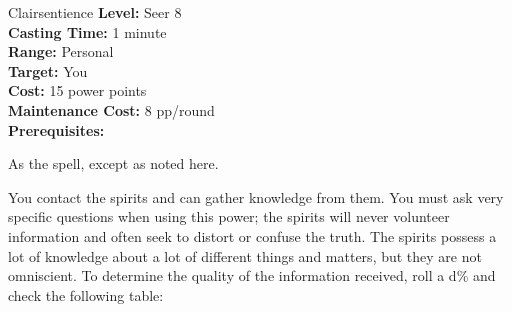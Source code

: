 {Clairsentience}
{
	\textbf{Level:}
	Seer 8\\
	\textbf{Casting Time:}
	1 minute\\
	\textbf{Range:}
	Personal\\
	\textbf{Target:}
	You\\
	\textbf{Cost:}
	15 power points\\
	\textbf{Maintenance Cost:}
	8 pp/round\\
	\textbf{Prerequisites:}
	\\
}
{
	As the  spell, except as noted here.

	You contact the spirits and can gather knowledge from them.	You must ask very specific questions when using this power; the spirits will never volunteer information and often seek to distort or confuse the truth. The spirits possess a lot of knowledge about a lot of different things and matters, but they are not omniscient. To determine the quality of the information received, roll a d\% and check the following table:

}